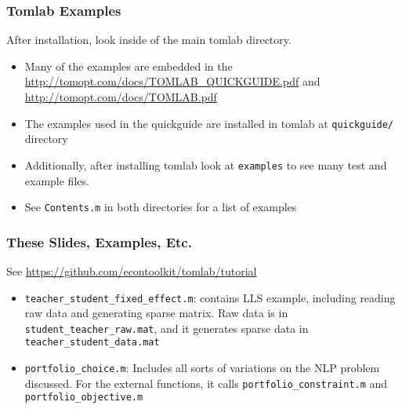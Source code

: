 \documentclass[nofootline]{etk-presentation}
\begin{document}
\begin{frame}[fragile]	\frametitle{Tomlab Examples}
	After installation, look inside of the main tomlab directory.
	\begin{itemize}
		\item 	Many of the examples are embedded in the \url{http://tomopt.com/docs/TOMLAB_QUICKGUIDE.pdf} and \url{http://tomopt.com/docs/TOMLAB.pdf}
		\item The examples used in the quickguide are installed in tomlab at \verb!quickguide/! directory
		\item Additionally, after installing tomlab look at \verb!examples! to see many test and example files.
		\item See \verb!Contents.m! in both directories for a list of examples
	\end{itemize}
\end{frame}	
	

\begin{frame}[fragile]	\frametitle{These Slides, Examples, Etc.}
See \url{https://github.com/econtoolkit/tomlab/tutorial}
	\begin{itemize}
			\item \verb!teacher_student_fixed_effect.m!: contains LLS example, including reading raw data and generating sparse matrix.  Raw data is in \verb!student_teacher_raw.mat!, and it  generates sparse data in \verb!teacher_student_data.mat!
			\item \verb!portfolio_choice.m!: Includes all sorts of variations on the NLP problem discussed.  For the external functions, it calls \verb!portfolio_constraint.m! and \verb!portfolio_objective.m!
	\end{itemize}
	
\end{frame}	
\end{document}
